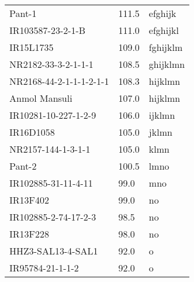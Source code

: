 \documentclass[]{article}
\begin{document}
\begin{longtable}{lll}
Pant-1 & 111.5 & efghijk\\
\rowcolor{gray!6}  IR103587-23-2-1-B & 111.0 & efghijkl\\
IR15L1735 & 109.0 & fghijklm\\
\addlinespace
\rowcolor{gray!6}  NR2182-33-3-2-1-1-1 & 108.5 & ghijklmn\\
NR2168-44-2-1-1-1-2-1-1 & 108.3 & hijklmn\\
\rowcolor{gray!6}  Anmol Mansuli & 107.0 & hijklmn\\
IR10281-10-227-1-2-9 & 106.0 & ijklmn\\
\rowcolor{gray!6}  IR16D1058 & 105.0 & jklmn\\
\addlinespace
NR2157-144-1-3-1-1 & 105.0 & klmn\\
\rowcolor{gray!6}  Pant-2 & 100.5 & lmno\\
IR102885-31-11-4-11 & 99.0 & mno\\
\rowcolor{gray!6}  IR13F402 & 99.0 & no\\
IR102885-2-74-17-2-3 & 98.5 & no\\
\addlinespace
\rowcolor{gray!6}  IR13F228 & 98.0 & no\\
HHZ3-SAL13-4-SAL1 & 92.0 & o\\
\rowcolor{gray!6}  IR95784-21-1-1-2 & 92.0 & o\\
\bottomrule
\end{longtable}

\endgroup{}
\begingroup\fontsize{12}{14}\selectfont
\end{document}
